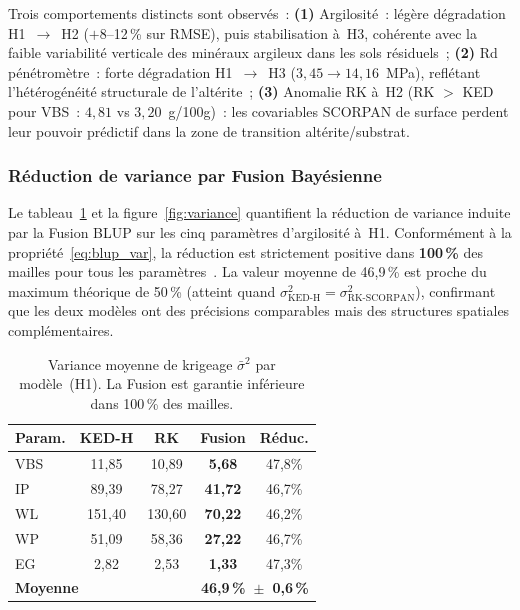 \documentclass[10pt,a4paper,twocolumn]{article}
\newcommand{\KED}{\text{KED-H}}
\newcommand{\RK}{\text{RK-SCORPAN}}
\begin{document}
	Trois comportements distincts sont observés~:
	\textbf{(1)} Argilosité~: légère dégradation H1~$\to$~H2 ($+$8--12\,\%
	sur RMSE), puis stabilisation à~H3, cohérente avec la faible
	variabilité verticale des minéraux argileux dans les sols résiduels~;
	\textbf{(2)} Rd pénétromètre~: forte dégradation H1~$\to$~H3
	($3{,}45\to14{,}16$~MPa), reflétant l'hétérogénéité structurale de
	l'altérite~;
	\textbf{(3)} Anomalie RK à~H2 (RK $>$ KED pour VBS~: $4{,}81$
	vs $3{,}20$~g/100g)~: les covariables SCORPAN de surface perdent
	leur pouvoir prédictif dans la zone de transition altérite/substrat.
	
	\subsubsection{Réduction de variance par Fusion Bayésienne}

	Le tableau~\ref{tab:variance} et la figure~\ref{fig:variance}
	quantifient la réduction de variance induite par la Fusion BLUP
	sur les cinq paramètres d'argilosité à~H1.
	Conformément à la propriété~\eqref{eq:blup_var},
	la réduction est strictement positive dans \textbf{100\,\%}
	des mailles pour tous les paramètres~\cite{chilesdelfiner2012}.
	La valeur moyenne de 46{,}9\,\% est proche du maximum
	théorique de 50\,\% (atteint quand
	$\sigma^2_{\KED}=\sigma^2_{\RK}$), confirmant que les deux
	modèles ont des précisions comparables mais des structures
	spatiales complémentaires.

	\begin{table}[htbp]
		\centering\small
		\caption{Variance moyenne de krigeage $\bar{\sigma}^2$ par
			modèle~(H1). La Fusion est garantie inférieure dans
			100\,\% des mailles.}
		\label{tab:variance}
		\begin{tabular}{lcccc}
			\toprule
			Param. & KED-H  & RK     & Fusion & Réduc. \\
			\midrule
			VBS & 11,85 & 10,89 & \textbf{5,68}  & 47,8\% \\
			IP  & 89,39 & 78,27 & \textbf{41,72} & 46,7\% \\
			WL  &151,40 &130,60 & \textbf{70,22} & 46,2\% \\
			WP  & 51,09 & 58,36 & \textbf{27,22} & 46,7\% \\
			EG  &  2,82 &  2,53 & \textbf{1,33}  & 47,3\% \\
			\midrule
			\multicolumn{3}{l}{\textbf{Moyenne}} &
			\multicolumn{2}{r}{\textbf{46,9\,\%~$\pm$~0,6\,\%}} \\
			\bottomrule
		\end{tabular}
	\end{table}
	
\end{document}
